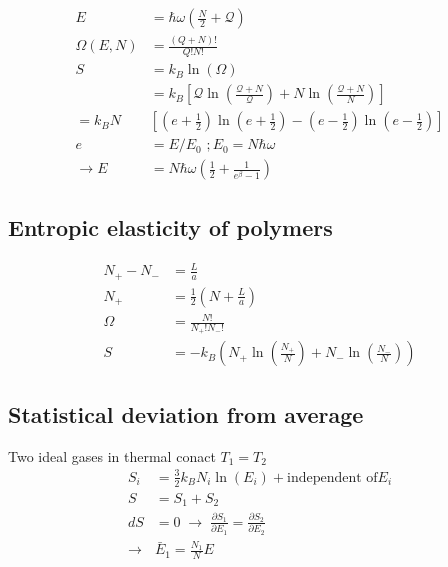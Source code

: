 \begin{equation*}
    \begin{aligned}
        E &= \hbar \omega \left(\frac{N}{2} + \mathcal{Q}\right) \\
        \Omega(E,N) &= \frac{(Q+N)!}{Q!N!} \\
        S &= k_B \ln(\Omega) \\
          &= k_B \left[\mathcal{Q}\ln \left(\frac{\mathcal{Q}+N}{\mathcal{Q}}\right) + N \ln \left(\frac{\mathcal{Q}+N}{N}\right)\right] \\
          = k_B N &\left[(e + \frac{1}{2}) \ln (e + \frac{1}{2})- (e-\frac{1}{2}) \ln (e- \frac{1}{2})\right] \\
          e &= E/E_0 \,\, ; E_0 = N \hbar \omega \\
          \rightarrow E &= N \hbar \omega \left(\frac{1}{2} + \frac{1}{e^\beta -1}\right)
    \end{aligned}
\end{equation*}

\subsection*{Entropic elasticity of polymers}

\begin{equation*}
    \begin{aligned}
        N_+ - N_- &= \frac{L}{a} \\
        N_+ &= \frac{1}{2} \left(N + \frac{L}{a}\right) \\
        \Omega &= \frac{N!}{N_+! N_-!} \\
        S &= -k_B \left(N_+ \ln \left(\frac{N_+}{N}\right)+N_-\ln\left(\frac{N_-}{N}\right)\right)
    \end{aligned}
\end{equation*}

\subsection*{Statistical deviation from average}
Two ideal gases in thermal conact $T_1 = T_2$ 
\begin{equation*}
    \begin{aligned}
        S_i &= \frac{3}{2} k_B N_i \ln (E_i) + \text{independent of} E_i \\
        S &= S_1 + S_2 \\
        dS &= 0 \; \rightarrow \; \frac{\partial S_1}{\partial E_1} = \frac{\partial S_2}{\partial E_2} \\
        \rightarrow & \bar{E}_1 = \frac{N_1}{N} E
    \end{aligned}
\end{equation*}

